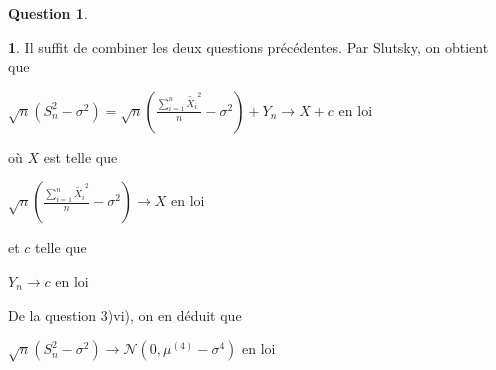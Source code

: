 \documentclass[12pt]{article}
\newcommand{\1}{\mathbbm{1}}
\newcommand{\Nc}{\mathcal{N}}
\newcommand{\Xti}{\widetilde{X_i}}
\theoremstyle{definition}\newtheorem{defn}{Définition}
\theoremstyle{definition}\newtheorem{exm}{Exemple}
\theoremstyle{definition}\newtheorem{rem}{Remarque}
\theoremstyle{definition}\newtheorem{algo}{Algorithme}
\theoremstyle{remark}\newtheorem{exo}{Exercice}
\theoremstyle{remark}\newtheorem{nota}{Notation}
\theoremstyle{definition}\newtheorem{1q}{Question}
\theoremstyle{definition}\newtheorem{2q}{Question}
\theoremstyle{definition}\newtheorem{3q}{Question}
\theoremstyle{definition}\newtheorem{4q}{Question}
\theoremstyle{definition}\newtheorem{2qs1}{}
\theoremstyle{definition}\newtheorem{2qs2}{}
\theoremstyle{definition}\newtheorem{2qs3}{}
\theoremstyle{definition}\newtheorem{2qs4}{}
\theoremstyle{definition}\newtheorem{4qs2}{}
\theoremstyle{definition}\newtheorem{4qs3}{}
\begin{document}
\begin{4q}
\begin{4qs3}
Il suffit de combiner les deux questions précédentes.
Par Slutsky, on obtient que
\begin{center} $\sqrt{n}(S_n^2-\sigma^2) = \sqrt{n}\left(\displaystyle\frac{\sum_{i=1}^n \Xti^2}{n} - \sigma^2\right) + Y_n \longrightarrow X + c$ en loi\end{center}
où $X$ est telle que 
\begin{center}
$\sqrt{n}\left(\displaystyle\frac{\sum_{i=1}^n \Xti^2}{n} - \sigma^2\right)\longrightarrow X $ en loi
\end{center}
et $c$ telle que
\begin{center}
$Y_n \longrightarrow c $ en loi
\end{center}
De la question 3)vi), on en déduit que
\begin{center}$ \sqrt{n}(S_n^2-\sigma^2) \longrightarrow \Nc(0,\mu^{(4)} - \sigma^4) $ en loi\end{center}
\end{4qs3}


\end{4q}

















\pagebreak









\end{document}
